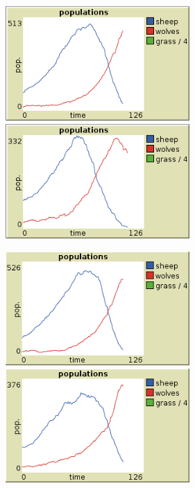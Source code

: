 \documentclass[12pt,letterpaper]{article}
\begin{document}
\begin{itemize}
	\begin{figure}
	\centering
		\begin{minipage}{.5\textwidth}
			\centering
			\includegraphics[width=7cm]{./imagenes/image8.png}
		\end{minipage}%
		\begin{minipage}{.5\textwidth}
  			\centering
  			\includegraphics[width=7cm]{./imagenes/image9.png}
		\end{minipage}
	\end{figure}
	\begin{figure}
	\centering
		\begin{minipage}{.5\textwidth}
			\centering
			\includegraphics[width=7cm]{./imagenes/image10.png}
		\end{minipage}%
		\begin{minipage}{.5\textwidth}
  			\centering
  			\includegraphics[width=7cm]{./imagenes/image11.png}
		\end{minipage}
	\end{figure}
	

\end{itemize}
\end{document}
